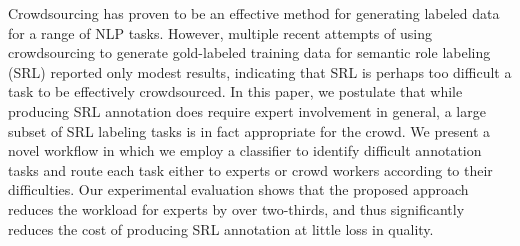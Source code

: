Crowdsourcing has proven to be an effective method for generating labeled data for a range of NLP tasks. However, multiple recent attempts of using crowdsourcing to generate gold-labeled training data for semantic role labeling (SRL) reported only modest results, indicating that SRL is perhaps too difficult a task to be effectively crowdsourced. In this paper, we postulate that while producing SRL annotation does require expert involvement in general, a large subset of SRL labeling tasks is in fact appropriate for the crowd. We present a novel workflow in which we employ a classifier to identify difficult annotation tasks and route each task either to experts or crowd workers according to their difficulties. Our experimental evaluation shows that the proposed approach reduces the workload for experts by over two-thirds, and thus significantly reduces the cost of producing SRL annotation at little loss in quality.
